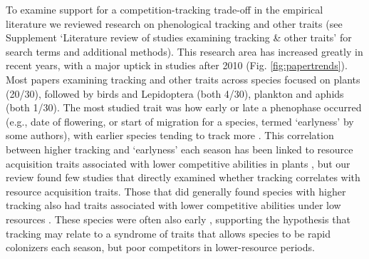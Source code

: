 \documentclass[11pt,letterpaper]{article}
\begin{document}
To examine support for a competition-tracking trade-off in the empirical literature we reviewed research on phenological tracking and other traits (see Supplement `Literature review of studies examining tracking \& other traits' for search terms and additional methods). This research area has increased greatly in recent years, with a major uptick in studies after 2010 (Fig. \ref{fig:papertrends}). Most papers examining tracking and other traits across species focused on plants (20/30), followed by birds and Lepidoptera (both 4/30), plankton and aphids (both 1/30). The most studied trait was how early or late a phenophase occurred (e.g., date of flowering, or start of migration for a species, termed `earlyness' by some authors), with earlier species tending to track more \citep[studies included both birds and Lepidotera,][]{Diamond:2011nx,Ishioka2013,kharouba2014,jing2016,du2017}. This correlation between higher tracking and `earlyness' each season has been linked to resource acquisition traits associated with lower competitive abilities in plants \citep[e.g., they tend to be of lower height, have shallower roots, narrower diameter vessels, thinner leaves, and grow faster, reviewed in][]{wolkovich2014aob}, but our review found few studies that directly examined whether tracking correlates with resource acquisition traits. Those that did generally found species with higher tracking also had traits associated with lower competitive abilities under low resources \citep[e.g., being shallower rooted or lacking a taproot,][]{Dorji2013,lasky2016,Zhu2016BioLetters}. These species were often also early \citep[e.g.,][]{Dorji2013,Zhu2016BioLetters}, supporting the hypothesis that tracking may relate to a syndrome of traits that allows species to be rapid colonizers each season, but poor competitors in lower-resource periods.

\end{document}
